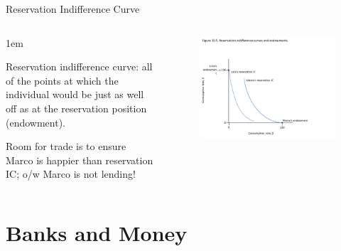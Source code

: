 \documentclass[11pt,aspectratio=43,usenames,dvipsnames]{beamer}
\let\olditemize=\itemize
\let\endolditemize=\enditemize
\renewenvironment{itemize}{\olditemize \itemsep1em}{\endolditemize}
\theoremstyle{definition}
\begin{document}
\begin{frame}{Reservation Indifference Curve}
\label{slide:Reservation_Indifference_Curve}
    \begin{columns}
        \begin{column}{0.4\textwidth}
            \begin{itemize}
                \item Reservation indifference curve: all of the points at which the individual would be just as well off as at the reservation position (endowment).
                \item \alert{Room for trade} is to ensure Marco is happier than reservation IC; o/w Marco is not lending!
            \end{itemize}
        \end{column}
        \begin{column}{0.6\textwidth}
            \begin{figure}
                \centering
                \includegraphics[trim={1.5cm 1.5cm 1.5cm 1.5cm}, clip, width=\textwidth]{./figures/Figure7.pdf}
            \end{figure}

        \end{column}
    \end{columns}

\end{frame}

\section[\faBank \& \faMoney]{Banks and Money}
\label{sec:Banks_and_Money}
\end{document}
